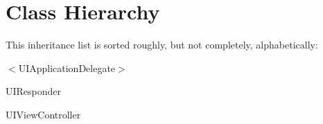 \section{Class Hierarchy}
This inheritance list is sorted roughly, but not completely, alphabetically\-:\begin{DoxyCompactList}
\item {}
\item $<$U\-I\-Application\-Delegate$>$\begin{DoxyCompactList}
\item {}
\end{DoxyCompactList}
\item U\-I\-Responder\begin{DoxyCompactList}
\item {}
\end{DoxyCompactList}
\item U\-I\-View\-Controller\begin{DoxyCompactList}
\item {}
\end{DoxyCompactList}
\end{DoxyCompactList}
